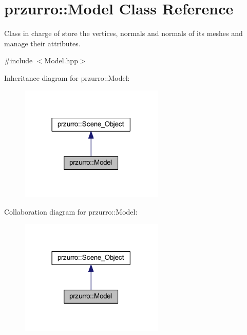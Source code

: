 \hypertarget{classprzurro_1_1_model}{}\section{przurro\+::Model Class Reference}
\label{classprzurro_1_1_model}


Class in charge of store the vertices, normals and normals of it\textquotesingle{}s meshes and manage their attributes.  




{\ttfamily \#include $<$Model.\+hpp$>$}



Inheritance diagram for przurro\+::Model\+:
\nopagebreak
\begin{figure}[H]
\begin{center}
\leavevmode
\includegraphics[width=194pt]{dd/d3b/classprzurro_1_1_model__inherit__graph}
\end{center}
\end{figure}


Collaboration diagram for przurro\+::Model\+:
\nopagebreak
\begin{figure}[H]
\begin{center}
\leavevmode
\includegraphics[width=194pt]{dd/d71/classprzurro_1_1_model__coll__graph}
\end{center}
\end{figure}
